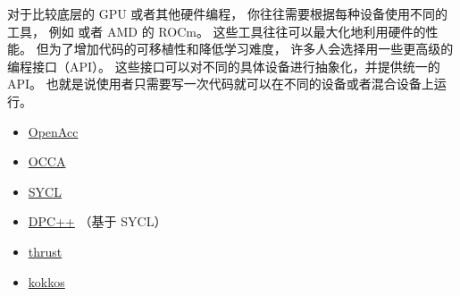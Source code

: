 
\begin{issues}
\issueDraft
\end{issues}

对于比较底层的 GPU 或者其他硬件编程， 你往往需要根据每种设备使用不同的工具， 例如  或者 AMD 的 ROCm。 这些工具往往可以最大化地利用硬件的性能。 但为了增加代码的可移植性和降低学习难度， 许多人会选择用一些更高级的编程接口（API）。 这些接口可以对不同的具体设备进行抽象化，并提供统一的 API。 也就是说使用者只需要写一次代码就可以在不同的设备或者混合设备上运行。

\begin{itemize}
\item \href{https://www.openacc.org/}{OpenAcc}
\item \href{https://libocca.org/}{OCCA}
\item \href{https://www.khronos.org/api/index_2017/sycl}{SYCL}
\item \href{https://www.intel.com/content/www/us/en/developer/tools/oneapi/dpc-compiler.html#gs.5ytas2}{DPC++} （基于 SYCL）
\item \href{https://developer.nvidia.com/thrust}{thrust}
\item \href{https://kokkos.github.io/}{kokkos}
\end{itemize}

